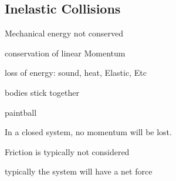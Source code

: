 \documentclass{article}
\begin{document}
    \subsection{Inelastic Collisions}
        \begin{list}{-}{}
            \item Mechanical energy not conserved 
            \item conservation of linear Momentum
            \item loss of energy: sound, heat, Elastic, Etc 
            \item bodies stick together 
            \item paintball
        \end{list}

    In a closed system, no momentum will be  lost. 

    \begin{list}{-}{}
        \item Friction is typically not considered 
        \item typically the system will have a net force
    \end{list}
\end{document}
